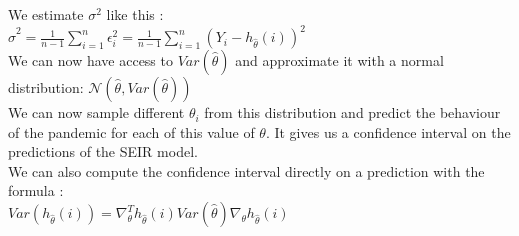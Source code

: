 \documentclass{article}
\begin{document}
We estimate $\sigma^2$ like this : \\

$\hat{\sigma}^2 = \frac{1}{n-1} \sum_{i=1}^{n} \epsilon_i^2  = \frac{1}{n-1} \sum_{i=1}^{n} (Y_i - h_{\hat{\theta}}(i))^2$\\


We can now have access to $Var(\hat{\theta})$ and approximate it with a normal distribution: $\mathcal{N} (\hat{\theta}, Var(\hat{\theta}))$\\

We can now sample different $\theta_i$ from this distribution and predict the behaviour of the pandemic for each of this value of $\theta$. It gives us a confidence interval on the predictions of the SEIR model.\\

We can also compute the confidence interval directly on a prediction with the formula :\\

$Var(h_{\hat{\theta}}(i)) = \nabla_{\theta} ^T h_{\hat{\theta}}(i) Var(\hat{\theta}) \nabla_{\theta} h_{\hat{\theta}}(i)$\\
\end{document}
